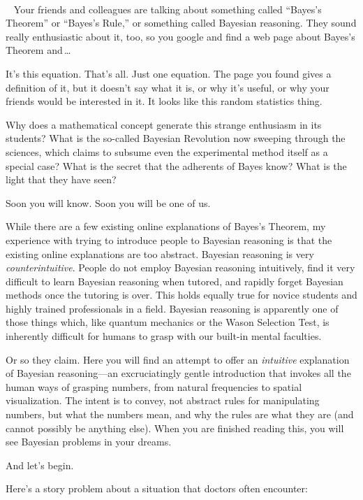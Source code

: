 {\textit{ ~}


\textit{\ } Your friends and colleagues are talking about something
called ``Bayes's
Theorem'' or
``Bayes's Rule,'' or
something called Bayesian reasoning. They sound really enthusiastic
about it, too, so you google and find a web page about
Bayes's Theorem and\,\ldots


 It's this equation. That's all.
Just one equation. The page you found gives a definition of it, but it
doesn't say what it is, or why it's
useful, or why your friends would be interested in it. It looks like
this random statistics thing.


 Why does a mathematical concept generate this strange enthusiasm
in its students? What is the so-called Bayesian Revolution now sweeping
through the sciences, which claims to subsume even the experimental
method itself as a special case? What is the secret that the adherents
of Bayes know? What is the light that they have seen?


 Soon you will know. Soon you will be one of us.


 While there are a few existing online explanations of
Bayes's Theorem, my experience with trying to introduce
people to Bayesian reasoning is that the existing online explanations
are too abstract. Bayesian reasoning is very \textit{counterintuitive}.
People do not employ Bayesian reasoning intuitively, find it very
difficult to learn Bayesian reasoning when tutored, and rapidly forget
Bayesian methods once the tutoring is over. This holds equally true for
novice students and highly trained professionals in a field. Bayesian
reasoning is apparently one of those things which, like quantum
mechanics or the Wason Selection Test, is inherently difficult for
humans to grasp with our built-in mental faculties.


 Or so they claim. Here you will find an attempt to offer an
\textit{intuitive} explanation of Bayesian reasoning---an
excruciatingly gentle introduction that invokes all the human ways of
grasping numbers, from natural frequencies to spatial visualization.
The intent is to convey, not abstract rules for manipulating numbers,
but what the numbers mean, and why the rules are what they are (and
cannot possibly be anything else). When you are finished reading this,
you will see Bayesian problems in your dreams.


 And let's begin.

\hr


 Here's a story problem about a situation that
doctors often encounter:

}
